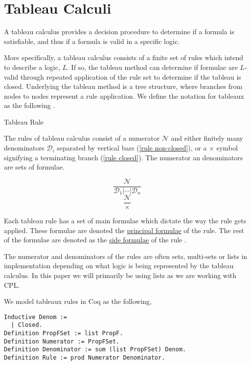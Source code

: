 \documentclass{llncs}
\begin{document}
\section{Tableau Calculi}
%
A tableau calculus provides a decision procedure to determine if a formula is
satisfiable, and thus if a formula is valid in a specific logic.

More specifically, a tableau calculus consists of a finite set of rules which
intend to describe a logic, $L$. If so, the tableau method can determine if
formulae are $L$-valid through repeated application of the rule set to
determine if the tableau is closed. Underlying the tableau method is a tree
structure, where branches from nodes to nodes represent a rule application. We
define the notation for tableaux as the following \cite{d2013handbook}.
%
\begin{definition}{Tableau Rule}\label{Tableau Rule}

The rules of tableau calculus consist of a numerator $\mathcal{N}$ and
either finitely many denominators $\mathcal{D}_i$ separated by vertical bars
(\ref{rule non-closed}), or a $\times$ symbol signifying a terminating branch
(\ref{rule closed}).  The numerator an denominators are sets of formulae.
%
\begin{multicols}{2}
\noindent
\begin{equation}
\frac{\mathcal{N}}{\mathcal{D}_1 \vert \cdots \vert \mathcal{D}_n}
\label{rule non-closed}
\end{equation}
\begin{equation}
\frac{\mathcal{N}}{\times}
\label{rule closed}
\end{equation}
\end{multicols}
%
Each tableau rule has a set of main formulae which dictate the way the rule
gets applied. These formulae are denoted the \underline{principal formulae} of
the rule. The rest of the formulae are denoted as the \underline{side formulae}
of the rule \cite{d2013handbook}.

The numerator and denominators of the rules are often sets, multi-sets or lists
in implementation depending on what logic is being represented by the tableau
calculus. In this paper we will primarily be using lists as we are working with
CPL.
\end{definition}

We model tableaux rules in Coq as the following,
%
\begin{verbatim}
Inductive Denom :=
  | Closed.
Definition PropFSet := list PropF.
Definition Numerator := PropFSet.
Definition Denominator := sum (list PropFSet) Denom.
Definition Rule := prod Numerator Denominator.
\end{verbatim}
\end{document}
